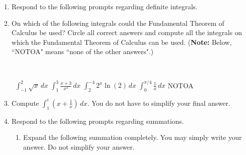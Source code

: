 \documentclass[11pt]{article}
\begin{document}
\begin{enumerate}
\begin{center}
        \begin{tabular}{l c r l c r}
            $\displaystyle\int x^{-12}\,dx$ & $=$ & \rule[-8pt]{1.5in}{0.4pt} &
            $\displaystyle\int e^{14} \,dx$ & $=$ & \rule[-8pt]{1.5in}{0.4pt}\\[1in]
            $\displaystyle\int e^x\,dx$ & $=$ & \rule[-8pt]{1.5in}{0.4pt}&
            $\displaystyle\int 3e^x+x^{90}\,dx$ & $=$ & \rule[-8pt]{1.5in}{0.4pt}\\[1in]
            $\displaystyle\int \frac{17}{x} \,dx$ & $=$ & \rule[-8pt]{1.5in}{0.4pt} & 
            $\displaystyle\int \dfrac{17}{x^2} \,dx$ & $=$ & \rule[-8pt]{1.5in}{0.4pt}\\[1in]
            $\displaystyle\int 12^2 \ln(12)\,dx$ & $=$ & \rule[-8pt]{1.5in}{0.4pt} &
            $\displaystyle\int 12^x \ln(12) \,dx$ & $=$ & \rule[-8pt]{1.5in}{0.4pt}\\[1in]
        \end{tabular}
\end{center}
\newpage

\item[\textbf{I4.}]
Respond to the following prompts regarding definite integrals.
\item[(a)] On which of the following integrals could the Fundamental Theorem of Calculus be used? Circle all correct answers
and compute all the integrals on which the Fundamental Theorem of Calculus can be used. ({\bf Note:} Below, ``NOTOA" means ``none of the other answers".)

\

\,\hfill
{} $\displaystyle\int_{-1}^2 \sqrt{x}\,dx$
\hfill
{} $\displaystyle\int_{1}^3 \frac{x+3}{x^2}\,dx$
\hfill
{} $\displaystyle\int_{2}^{-4} 2^x \ln(2)\,dx$
\hfill
{} $\displaystyle\int_0^{\pi/4} \frac{1}{x}\,dx$
\hfill
{} NOTOA
\hfill\,

\vfill

\item[(b)] Compute $\displaystyle\int_{1}^{e}\left( x+\frac1x\right)\,dx$. You do not have to simplify your final answer.
\vfill
\newpage

\item[\textbf{F3.}]
Respond to the following prompts regarding summations.
\begin{enumerate}
\item[(a)] Expand the following summation completely. You may simply write your answer. Do not simplify your answer.\\


\end{enumerate}
\end{enumerate}
\end{document}
